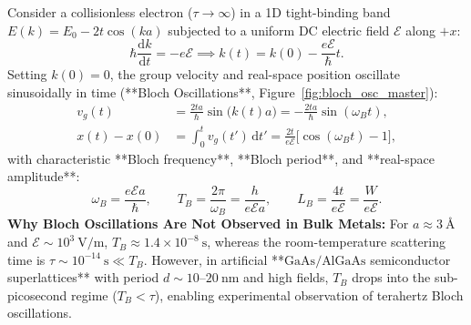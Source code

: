 \documentclass[11pt,a4paper]{article}
\newcommand{\dv}[2]{\frac{\mathrm{d}#1}{\mathrm{d}#2}}
\newcommand{\hb}{\hbar}
\newcommand{\dd}{\mathrm{d}}
\begin{document}
Consider a collisionless electron ($\tau \to \infty$) in a 1D tight-binding band $E(k) = E_0 - 2t\cos(ka)$ subjected to a uniform DC electric field $\mathcal{E}$ along $+x$:
\begin{equation}
    \hb\dv{k}{t} = -e\mathcal{E} \implies k(t) = k(0) - \frac{e\mathcal{E}}{\hb}t.
\end{equation}
Setting $k(0) = 0$, the group velocity and real-space position oscillate sinusoidally in time (**Bloch Oscillations**, Figure~\ref{fig:bloch_osc_master}):
\begin{align}
    v_g(t) &= \frac{2ta}{\hb}\sin\big(k(t)a\big) = -\frac{2ta}{\hb}\sin(\omega_B t), \\
    x(t) - x(0) &= \int_0^t v_g(t')\,\dd t' = \frac{2t}{e\mathcal{E}}\big[\cos(\omega_B t) - 1\big],
\end{align}
with characteristic **Bloch frequency**, **Bloch period**, and **real-space amplitude**:
\begin{equation}
    \boxed{\omega_B = \frac{e\mathcal{E}a}{\hb}, \qquad T_B = \frac{2\pi}{\omega_B} = \frac{h}{e\mathcal{E}a}, \qquad L_B = \frac{4t}{e\mathcal{E}} = \frac{W}{e\mathcal{E}}.}
\end{equation}
\textbf{Why Bloch Oscillations Are Not Observed in Bulk Metals:} For $a \approx 3\ \text{\AA}$ and $\mathcal{E} \sim 10^3\ \mathrm{V/m}$, $T_B \approx 1.4 \times 10^{-8}\ \mathrm{s}$, whereas the room-temperature scattering time is $\tau \sim 10^{-14}\ \mathrm{s} \ll T_B$. However, in artificial **$\text{GaAs}/\text{AlGaAs}$ semiconductor superlattices** with period $d \sim 10\text{--}20\ \mathrm{nm}$ and high fields, $T_B$ drops into the sub-picosecond regime ($T_B < \tau$), enabling experimental observation of terahertz Bloch oscillations.
\end{document}

